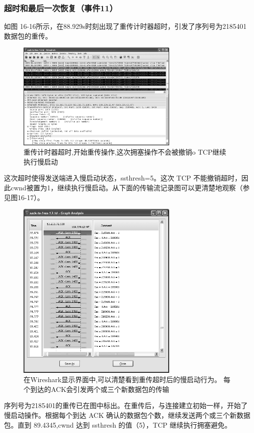 \subsubsection{超时和最后一次恢复（事件11）}
如图 16-16所示，在88.929s时刻出现了重传计时器超时，引发了序列号为2185401数据包的重传。
\begin{figure}[!htb]
    \centering
	\includegraphics[width=0.7\textwidth]{imgs/16/16-16.png}
	\caption{重传计时器超时,开始重传操作,这次拥塞操作不会被撤销o TCP继续执行慢启动}
\end{figure}
这次超时使得发送端进入慢启动状态，ssthresh=5。这次 TCP 不能撤销超时，因此cwnd被置为1，继续执行慢启动。从下面的传输流记录图可以更清楚地观察（参见图16-17）。
\begin{figure}[!htb]
    \centering
	\includegraphics[width=0.7\textwidth]{imgs/16/16-17.png}
	\caption{在Wireshark显示界面中,可以清楚看到重传超时后的慢启动行为。
    每个到达的ACK会引发两个或三个新数据包的传输}
\end{figure}
序列号为2185401的重传已在图中标出。在重传后，与连接建立初始一样，开始了慢启动操作。根据每个到达 ACK 确认的数据包个数，继续发送两个或三个新数据包。直到
89.4345,cwnd 达到 ssthresh 的值（5），TCP 继续执行拥塞避免。


